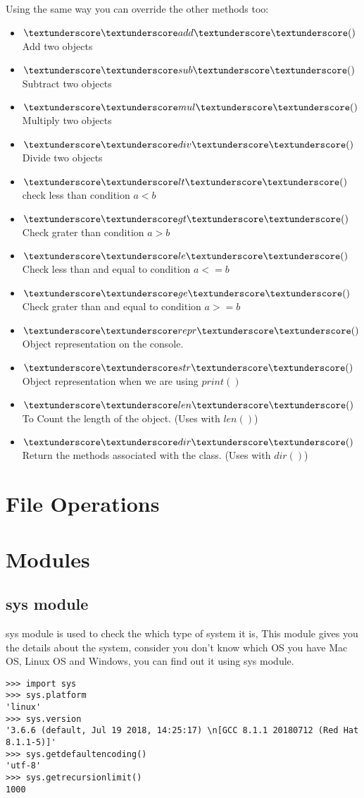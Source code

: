 \documentclass[letterpaper,12pt]{book}
\begin{document}
Using the same way you can override the other methods too:
\begin{itemize}
\item  $\textunderscore\textunderscore add \textunderscore\textunderscore()$ Add two objects
\item  $\textunderscore\textunderscore sub \textunderscore\textunderscore()$ Subtract two objects
\item  $\textunderscore\textunderscore mul \textunderscore\textunderscore()$ Multiply two objects
\item  $\textunderscore\textunderscore div \textunderscore\textunderscore()$ Divide two objects
\item  $\textunderscore\textunderscore lt \textunderscore\textunderscore()$ check less than condition $ a < b$
\item  $\textunderscore\textunderscore gt \textunderscore\textunderscore()$ Check grater than condition $ a > b$
\item  $\textunderscore\textunderscore le \textunderscore\textunderscore()$ Check less than and equal to condition $ a <= b$
\item  $\textunderscore\textunderscore ge \textunderscore\textunderscore()$ Check grater than and equal to condition $a >= b$
\item  $\textunderscore\textunderscore repr \textunderscore\textunderscore()$ Object representation on the console.
\item  $\textunderscore\textunderscore str \textunderscore\textunderscore()$ Object representation when we are using $print()$
\item  $\textunderscore\textunderscore len \textunderscore\textunderscore()$ To Count the length of the object. (Uses with $len()$)
\item  $\textunderscore\textunderscore dir \textunderscore\textunderscore()$ Return the methods associated with the class. (Uses with $dir()$)
\end{itemize}
\section{File Operations}
\section{Modules}
\subsection{sys module}
sys module is used to check the which type of system it is, This module gives you the details about the system, consider you don't know which OS you have Mac OS, Linux OS and Windows, you can find out it using sys module.
\begin{lstlisting}
>>> import sys
>>> sys.platform
'linux'
>>> sys.version
'3.6.6 (default, Jul 19 2018, 14:25:17) \n[GCC 8.1.1 20180712 (Red Hat 8.1.1-5)]'
>>> sys.getdefaultencoding()
'utf-8'
>>> sys.getrecursionlimit()
1000
\end{lstlisting}
\end{document}

